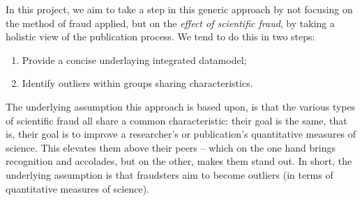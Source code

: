 \documentclass{ou-report}
\newcommand{\todo}[1]{{\color{red} TODO: #1}}
\begin{document}

In this project, we aim to take a step in this generic approach by not 
focusing on the method of fraud applied, but on the 
\emph{effect of scientific fraud}, by taking a holistic view of the publication 
process. We tend to do this in two steps:
\begin{enumerate}
\item Provide a concise underlaying integrated datamodel;
\item Identify outliers within groups sharing characteristics.
\end{enumerate}

The underlying assumption this approach is based upon, is that the various types 
of scientific fraud all 
share a common characteristic: their goal is the same, that is, their goal 
is to improve a researcher's or publication's quantitative measures of 
science. This elevates them above their peers -- which on the one hand 
brings recognition and accolades, but on the other, makes them stand out. In 
short, the underlying assumption is that fraudsters aim to become outliers 
(in terms of quantitative measures of science).
\end{document}
